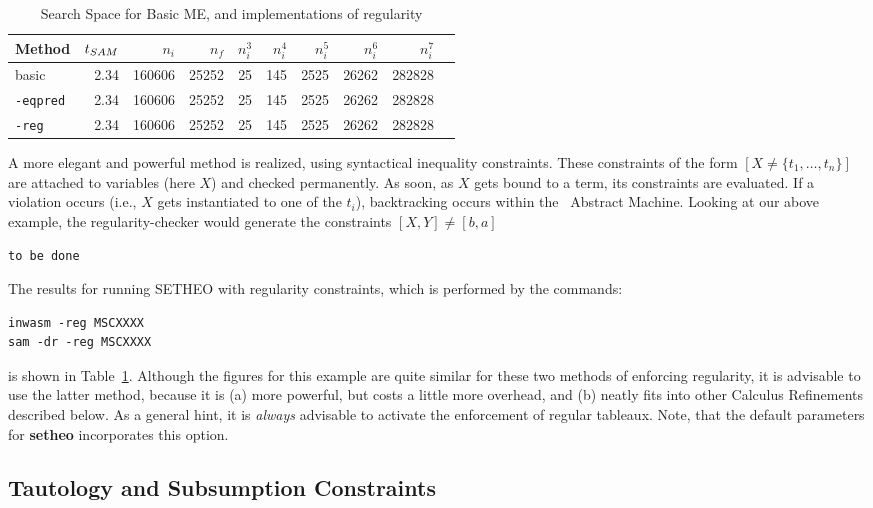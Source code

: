 \begin{table}[htb]
\begin{center}
\begin{tabular}{|l|r|r||r|r||r|r|r|r|r|}
\hline
Method & $t_{SAM}$ & $n_i$ & $n_f$ & 
	$n_i^3$ & $n_i^4$ & $n_i^5$ & $n_i^6$ & $n_i^7$ \\
\hline\hline
basic & 2.34 & 160606 & 25252 &
	25 & 145 & 2525 & 26262 & 282828 \\
\hline
{\tt -eqpred} & 2.34 & 160606 & 25252 &
	25 & 145 & 2525 & 26262 & 282828 \\
\hline
{\tt -reg} & 2.34 & 160606 & 25252 &
	25 & 145 & 2525 & 26262 & 282828 \\
\hline\hline
\end{tabular}
\end{center}
\caption{Search Space for Basic ME, and implementations of
regularity}
\label{tab:tut2:results.regularity}
\end{table}


A more elegant and powerful method is realized, using syntactical
inequality constraints. These constraints of the form
$ [ X \not = \{t_1,\ldots,t_n\}] $  are attached to variables (here $X$)
and checked permanently. As soon, as $X$ gets bound to a term,
its constraints are evaluated. If a violation occurs (i.e.,
$X$ gets instantiated to one of the $t_i$), backtracking
occurs within the \SAM\ Abstract Machine.
Looking at our above example, the regularity-checker would
generate the constraints $[ X,Y ] \not = [ b,a ]$

{\tt to be done}

The results for running SETHEO with regularity constraints, which
is performed by the commands:
\begin{center}
\begin{verbatim}
inwasm -reg MSCXXXX
sam -dr -reg MSCXXXX
\end{verbatim}
\end{center}
is shown in Table~\ref{tab:tut2:results.regularity}.
Although the figures for this example are quite similar for these
two methods of enforcing regularity, it is advisable to use the
latter method, because it is (a) more powerful, but costs a little
more overhead, and (b) neatly fits into other Calculus Refinements
described below. As a general hint, it is {\em always\/} advisable to
activate the enforcement of regular tableaux. Note, that the
default parameters for {\bf setheo} incorporates this option.

\subsection{Tautology and Subsumption Constraints}

